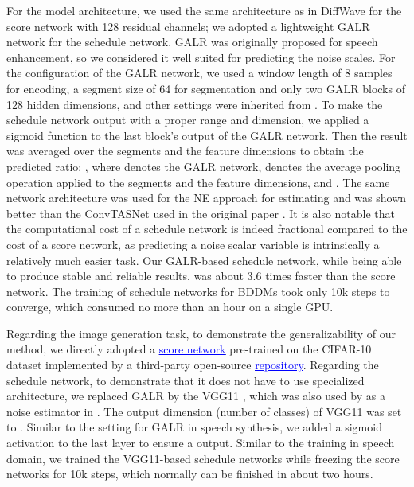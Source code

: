 For the model architecture, we used the same architecture as in DiffWave \citep{zhifeng2021} for the score network with 128 residual channels; we adopted a lightweight GALR network \citep{lam2021effective} for the schedule network. GALR was originally proposed for speech enhancement, so we considered it well suited for predicting the noise scales. For the configuration of the GALR network, we used a window length of 8 samples for encoding, a segment size of 64 for segmentation and only two GALR blocks of 128 hidden dimensions, and other settings were inherited from \citep{lam2021effective}. To make the schedule network output with a proper range and dimension, we applied a sigmoid function to the last block's output of the GALR network. Then the result was averaged over the segments and the feature dimensions to obtain the predicted ratio: , where  denotes the GALR network,  denotes the average pooling operation applied to the segments and the feature dimensions, and . The same network architecture was used for the NE approach for estimating  and was shown better than the ConvTASNet used in the original paper \citep{san2021noise}. It is also notable that the computational cost of a schedule network is indeed fractional compared to the cost of a score network, as predicting a noise scalar variable is intrinsically a relatively much easier task. Our GALR-based schedule network, while being able to produce stable and reliable results, was about 3.6 times faster than the score network. The training of schedule networks for BDDMs took only 10k steps to converge, which consumed no more than an hour on a single GPU.





Regarding the image generation task, to demonstrate the generalizability of our method, we directly adopted a \href{https://heibox.uni-heidelberg.de/d/01207c3f6b8441779abf/}{\textcolor{blue}{\underline{score network}}} pre-trained on the CIFAR-10 dataset implemented by a third-party open-source \href{https://github.com/pesser/pytorch_diffusion}{\textcolor{blue}{\underline{repository}}}. Regarding the schedule network, to demonstrate that it does not have to use specialized architecture, we replaced GALR by the VGG11 \citep{karen2014}, which was also used by as a noise estimator in \citep{san2021noise}. The output dimension (number of classes) of VGG11 was set to . Similar to the setting for GALR in speech synthesis, we added a sigmoid activation to the last layer to ensure a  output. Similar to the training in speech domain, we trained the VGG11-based schedule networks while freezing the score networks for 10k steps, which normally can be finished in about two hours.

